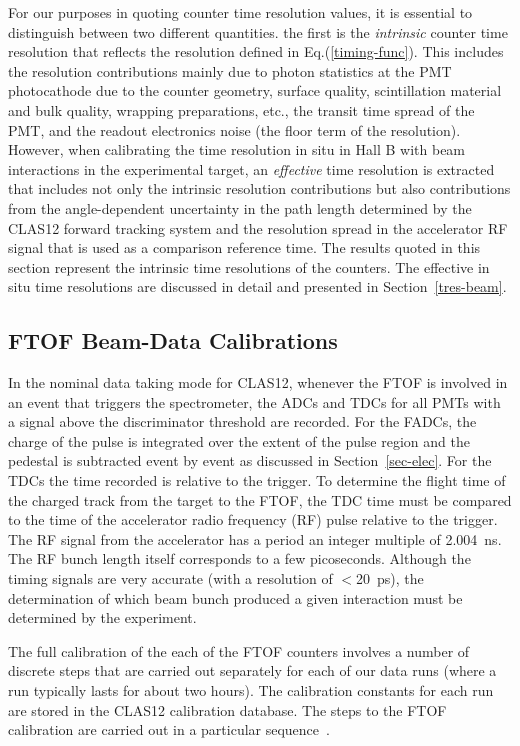 \documentclass{elsart}
\begin{document}
For our purposes in quoting counter time resolution values, it is essential to distinguish between two different
quantities. the first is the {\em intrinsic} counter time resolution that reflects the resolution defined in
Eq.(\ref{timing-func}). This includes the resolution contributions mainly due to photon statistics at the PMT
photocathode due to the counter geometry, surface quality, scintillation material and bulk quality, wrapping
preparations, etc., the transit time spread of the PMT, and the readout electronics noise (the floor term of the
resolution). However, when calibrating the time resolution in situ in Hall B with beam interactions in the experimental
target, an {\em effective} time resolution is extracted that includes not only the intrinsic resolution contributions but
also contributions from the angle-dependent uncertainty in the path length determined by the CLAS12 forward tracking
system and the resolution spread in the accelerator RF signal that is used as a comparison reference time. The
results quoted in this section represent the intrinsic time resolutions of the counters. The effective in situ
time resolutions are discussed in detail and presented in Section~\ref{tres-beam}.

\subsection{FTOF Beam-Data Calibrations}

In the nominal data taking mode for CLAS12, whenever the FTOF is involved in an event that triggers the
spectrometer, the ADCs and TDCs for all PMTs with a signal above the discriminator threshold are recorded.
For the FADCs, the charge of the pulse is integrated over the extent of the pulse region and the pedestal is
subtracted event by event as discussed in Section~\ref{sec-elec}. For the TDCs the time recorded is relative
to the trigger. To determine the flight time of the charged track from the target to the FTOF, the TDC time
must be compared to the time of the accelerator radio frequency (RF) pulse relative to the trigger.  The RF
signal from the accelerator has a period an integer multiple of 2.004~ns. The RF bunch length itself corresponds
to a few picoseconds. Although the timing signals are very accurate (with a resolution of $<$20~ps), the
determination of which beam bunch produced a given interaction must be determined by the experiment.

The full calibration of the each of the FTOF counters involves a number of discrete steps that are carried out
separately for each of our data runs (where a run typically lasts for about two hours). The calibration constants
for each run are stored in the CLAS12 calibration database. The steps to the FTOF calibration are carried out
in a particular sequence~\cite{ftof-calib}.
\end{document}
